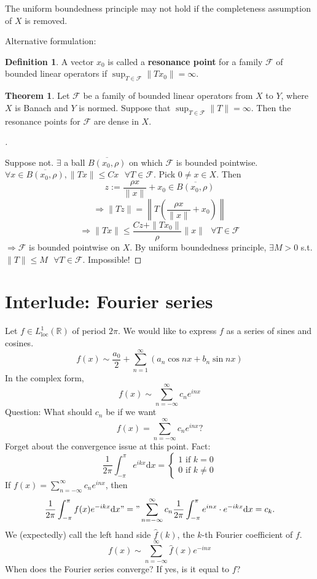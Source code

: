 \documentclass{article}
\theoremstyle{definition}
\newtheorem{thm}{Theorem}
\newtheorem{dfn}{Definition}
\newenvironment{proofs}[1][\proofname]{%
  \begin{proof}[#1]$ $\par\nobreak\ignorespaces
}{%
  \end{proof}
}
\newcommand{\sfa}{\text{  } \forall}
\begin{document}
The uniform boundedness principle may not hold if the completeness assumption of $X$ is removed.
\par Alternative formulation:

\begin{dfn}
	A vector $x_0$ is called a \textbf{resonance point} for a family $\mathcal{F}$ of bounded linear operators if $\sup_{T \in \mathcal{F}} \|T x_0\| = \infty$.
\end{dfn}

\begin{thm}
	Let $\mathcal{F}$ be a family of bounded linear operators from $X$ to $Y$, where $X$ is Banach and $Y$ is normed.
	Suppose that $\sup_{T \in \mathcal{F}} \|T\| = \infty$.
	Then the resonance points for $\mathcal{F}$ are dense in $X$.
\end{thm}

\begin{proofs}
	Suppose not.
	$\exists$ a ball $\overline{B(x_0, \rho)}$ on which $\mathcal{F}$ is bounded pointwise.
	$\forall x \in \overline{B(x_0, \rho)}, \|T x\| \leq C x \sfa T \in \mathcal{F}$.
	Pick $0 \neq x \in X$.
	Then 
	\[
		z := \frac{\rho x}{\|x\|} + x_0 \in \overline{B(x_0, \rho)}
	\]
	\[
		\Rightarrow \|T z \| = \left\|T\left(\frac{\rho x}{\|x\|} + x_0 \right) \right\|
	\]
	\[
		\Rightarrow \|T x\| \leq \frac{C z+ \|T x_0\|}{\rho} \|x\| \sfa T \in \mathcal{F}
	\]
	$\Rightarrow \mathcal{F}$ is bounded pointwise on $X$.
	By uniform boundedness principle, $\exists M > 0$ s.t. $\|T\| \leq M \sfa T \in \mathcal{F}$. Impossible!
\end{proofs}

\section*{Interlude: Fourier series}

Let $f \in L_{\text{loc}}^1( \mathbb{R})$ of period $2 \pi$.
We would like to express $f$ as a series of sines and cosines.
\[
	f(x) \sim \frac{a_0}{2} + \sum_{n = 1}^\infty (a_n \cos nx + b_n \sin nx)
\]
In the complex form, 
\[
	f(x) \sim \sum_{n =- \infty}^\infty c_n e^{inx}
\]
Question: What should $c_n$ be if we want
\[
	f(x) = \sum_{n = -\infty}^\infty c_n e^{inx}?
\]
Forget about the convergence issue at this point.
Fact: 
\[
	\frac{1}{2 \pi} \int_{- \pi}^\pi e^{ikx} \mathrm{d} x = 
	\begin{cases}
		1 \text{ if } k = 0\\
		0 \text{ if } k \neq 0
	\end{cases}
\]
If $f(x) = \sum_{n = -\infty}^\infty c_n e^{inx}$, then
\[
	\frac{1}{2 \pi}\int_{- \pi}^\pi f(x) e^{-ikx} \mathrm{d} x "=" \sum_{n = -\infty}^\infty c_n \frac{1}{2 \pi} \int_{- \pi}^\pi e^{inx} \cdot e^{-ikx} \mathrm{d} x = c_k.
\]
We (expectedly) call the left hand side $\hat{f}(k)$, the $k$-th Fourier coefficient of $f$.
\[
	f(x) \sim \sum_{n = -\infty}^\infty \hat{f}(x) e^{-inx}
\]
When does the Fourier series converge?
If yes, is it equal to $f$?
\end{document}
